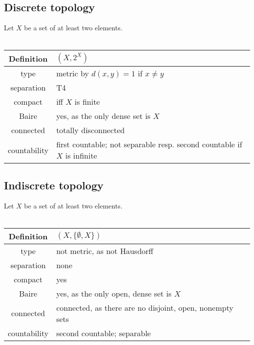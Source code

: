 \documentclass{scrartcl}
\begin{document}
\subsection{Discrete topology}
\label{top:discrete}
Let $X$ be a set of at least two elements.
\\\\
\begin{tabular}{c | p{}}
    Definition & $(X, 2^X)$ \\
    \hline
    type & metric by $d(x,y) = 1$ if $x \neq y$ \\
    separation & T4 \\
    compact & iff $X$ is finite \\
    Baire & yes, as the only dense set is $X$ \\
    connected & totally disconnected \\
    countability & first countable; not separable resp. second countable if $X$ is infinite
\end{tabular}

\subsection{Indiscrete topology}
\label{top:discrete}
Let $X$ be a set of at least two elements.
\\\\
\begin{tabular}{c | p{}}
    Definition & $(X, \{\emptyset, X\})$ \\
    \hline
    type & not metric, as not Hausdorff \\
    separation & none \\
    compact & yes \\
    Baire & yes, as the only open, dense set is $X$ \\
    connected & connected, as there are no disjoint, open, nonempty sets \\
    countability & second countable; separable
\end{tabular}
\end{document}
